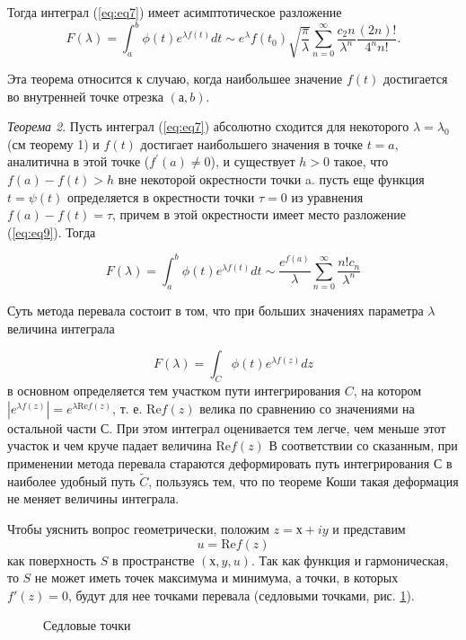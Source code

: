 \documentclass[14pt]{extarticle}
\renewcommand{\Re}{\mathrm{Re}}
\begin{document}
Тогда интеграл (\ref{eq:eq7}) имеет асимптотическое разложение
$$
F(\lambda)=\int_{a}^{b}\phi(t)e^{\lambda f(t)}dt \sim e^\lambda f(t_0) \sqrt{\frac{\pi}{\lambda}} \sum_{n=0}^{\infty}\frac{c_2n}{\lambda^n}\frac{(2n)!}{4^n n!}.
$$
  
Эта теорема относится к случаю, когда наибольшее значение $f(t)$ достигается во внутренней точке отрезка $(а, b)$. 

\textit{Теорема 2\label{th:th2}}. Пусть интеграл (\ref{eq:eq7}) абсолютно сходится для некоторого $\lambda = \lambda_0$ (см теорему 1) и $f(t)$ достигает наибольшего значения в точке $t=a$, аналитична в этой точке ($f^\prime(a) \neq 0$), и существует $h>0$ такое, что $f(a)-f(t)>h$ вне некоторой окрестности точки a. пусть еще функция $t=\psi(t)$ определяется в окрестности точки $\tau=0$ из уравнения $f(a) - f(t) = \tau$, причем в этой окрестности имеет место разложение (\ref{eq:eq9}). Тогда

\begin{equation}\label{eq:eq10}
F(\lambda) = \int_{a}^{b}\phi(t)e^{\lambda f(t)}dt \sim \frac{e^{f(a)}}{\lambda}\sum_{n=0}^{\infty}\frac{n! c_n}{\lambda^n}
\end{equation}
  
Суть метода перевала состоит в том, что при больших значениях параметра $\lambda$ величина интеграла
  
$$
F(\lambda) = \int_{C}^{}\phi(t)e^{\lambda f(z)}dz
$$
в основном определяется тем участком пути интегрирования $C$, на котором $|e^{\lambda f(z)}|=e^{\lambda \Re f(z)}$, т. е. $\Re f(z)$ велика по сравнению со значениями на остальной части $С$. При этом интеграл оценивается тем легче, чем меньше этот участок и чем круче падает величина $\Re f(z)$ В соответствии со сказанным, при применении метода перевала стараются деформировать путь интегрирования С в наиболее удобный путь $\widetilde{C}$, пользуясь тем, что по теореме Коши такая деформация не меняет величины интеграла.\cite{Lavrentyev}
  
Чтобы уяснить вопрос геометрически, положим $z = х + iy$ и представим
$$
u = \Re f(z)
$$
как поверхность $S$ в пространстве $(х, y, u)$. Так как функция и гармоническая, то $S$ не может иметь точек максимума и минимума, а точки, в которых $f'(z) = 0$, будут для нее точками перевала (седловыми точками, рис. \ref{ris:image2}).

\begin{figure}[h]
	\caption{Седловые точки}
	\label{ris:image2}
\end{figure}
\end{document}
